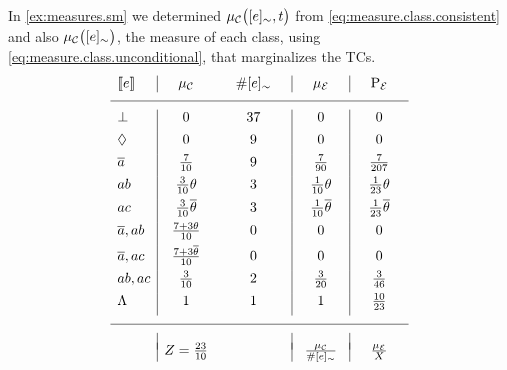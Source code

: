 \documentclass[x11names]{tlp}
\begin{document}
\ifExamples
	\begin{example}\label{ex:choerent.probability}\em

		In \cref{ex:measures.sm} we determined $\pwc{\class{e}, t}$ from
		\cref{eq:measure.class.consistent} and also $\pwc{\class{e}}$, the measure of
		each class, using \cref{eq:measure.class.unconditional}, that marginalizes
		the \aclp{TC}.
		\begin{equation*}
			\begin{array}{l|cc|c|c}
				\stablecore{e}
				       & \hspace{1em}\pwC\hspace{1em}
				       & \hspace{1em}\#\class{e}\hspace{1em}
				       & \hspace{1em}\pwE\hspace{1em}
				       & \hspace{1em}\prE\hspace{1em}
				\\
				\hline
				\inconsistent
				       & 0
				       & 37
				       & 0
				       & 0
				\\[4pt]
				\indepclass
				       & 0
				       & 9
				       & 0
				       & 0
				\\[4pt]
				\co{a}
				       & \frac{7}{10}
				       & 9
				       & \frac{7}{90}
				       & \frac{7}{207}
				\\[4pt]
				ab     & \frac{3}{10}\theta                  & 3 & \frac{1}{10}\theta      & \frac{1}{23}\theta \\[4pt]
				ac     & \frac{3}{10}\co{\theta}             & 3 & \frac{1}{10}\co{\theta} &
				\frac{1}{23}\co{\theta}                                                                         \\[4pt]
				\co{a}, ab
				       & \frac{7 + 3\theta}{10}
				       & 0
				       & 0
				       & 0
				\\[4pt]
				\co{a}, ac
				       & \frac{7 + 3\co{\theta}}{10}
				       & 0
				       & 0
				       & 0
				\\[4pt]
				ab, ac & \frac{3}{10}                        & 2 & \frac{3}{20}            & \frac{3}{46}       \\[4pt]
				\consequenceclass
				       & 1
				       & 1
				       & 1
				       & \frac{10}{23}
				\\[4pt]
				\hline
				       &
				       &
				       &
				       &
				\\[-0.5em]
				       & Z = \frac{23}{10}
				       &
				       & \frac{\pwC}{\#\class{e}}
				       & \frac{\pwE}{X}
			\end{array}
		\end{equation*}


\end{example}
\end{document}
